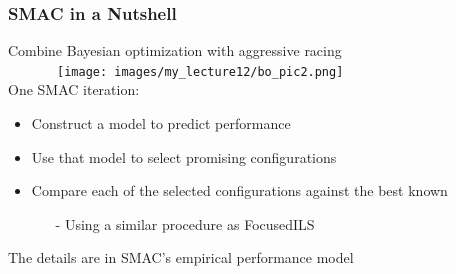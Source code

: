 \begin{frame}
\frametitle{SMAC in a Nutshell} \vspace*{-1mm}

Combine Bayesian optimization with aggressive racing\\
~~~~~~~\texttt{[image: images/my\_lecture12/bo\_pic2.png]}\\

One SMAC iteration:
\begin{itemize}
	\item Construct a model to predict performance
	\item Use that model to select promising configurations
	\item Compare each of the selected configurations against the best known 
	\begin{itemize}
		\item[-] \alert{Using a similar procedure as FocusedILS}
	\end{itemize}
\end{itemize}

\bigskip
\pause
The details are in SMAC's \alert{empirical performance model}

\end{frame}


